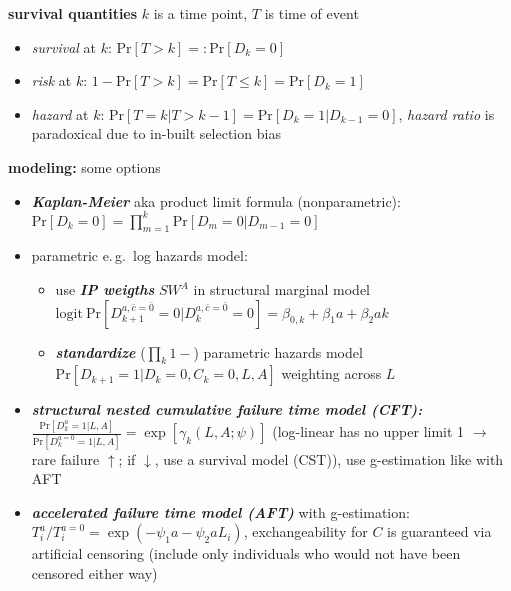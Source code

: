 \documentclass[8pt,twoside]{extarticle}
\begin{document}
\begin{multicols}{2}
\noindent \textbf{survival quantities} $k$ is a time point, $T$ is time of event
\begin{itemize}[itemsep=0em, topsep=0pt, partopsep=0pt,parsep=0pt, leftmargin=1.5em]
\setlength{\itemsep}{0pt}%
\setlength{\parskip}{0pt}
\item \textit{survival} at $k$: $\mathrm{Pr}\left[T>k\right] =:\mathrm{Pr}\left[D_k=0\right]$
\item \textit{risk} at $k$: $1-\mathrm{Pr}\left[T>k\right] = \mathrm{Pr}\left[T \leq k\right] = \mathrm{Pr}\left[D_k=1\right]$
\item \textit{hazard} at $k$: $\mathrm{Pr}\left[T=k|T> k{-}1\right] =\mathrm{Pr}\left[D_k=1|D_{k{-}1}=0\right]$, \textit{hazard ratio} is paradoxical due to  in-built selection bias
\end{itemize}

\noindent \textbf{modeling:} some options
\begin{itemize}[itemsep=0em, topsep=0pt, partopsep=0pt,parsep=0pt, leftmargin=1.5em]
\setlength{\itemsep}{0pt}%
\setlength{\parskip}{0pt}
\item \textit{\textbf{Kaplan-Meier}} aka product limit formula (nonparametric): $\mathrm{Pr}\left[D_k=0\right] = \prod_{m=1}^k \mathrm{Pr}\left[D_m=0|D_{m-1}=0\right]$
\item parametric e.\,g.\ log hazards model: 
\begin{itemize}[itemsep=0em, topsep=0pt, partopsep=0pt,parsep=0pt, leftmargin=1.5em]
\setlength{\itemsep}{0pt}%
\setlength{\parskip}{0pt}
\item use \textit{\textbf{IP weigths}} $SW^A$ in structural marginal model $\mathrm{logit} \: \mathrm{Pr}\left[D_{k+1}^{a, \bar{c}=\bar{0}}=0|D_{k}^{a, \bar{c}=\bar{0}}=0\right] = \beta_{0,k} + \beta_1a+\beta_2ak $
\item \textit{\textbf{standardize}} ($\prod_k 1-$) parametric hazards model $\mathrm{Pr}\left[D_{k+1}=1|D_k = 0, C_k=0, L, A\right]$ weighting across $L$
\end{itemize}
\item \textit{\textbf{structural nested cumulative failure time model (CFT):}}
$\frac{\mathrm{Pr}\left[D_k^a=1|L,A\right]}{\mathrm{Pr}\left[D_k^{a=0}=1|L,A\right]} = \exp\left[\gamma_k(L,A;\psi)\right]$ (log-linear has no upper limit 1 $\rightarrow$ rare failure $\uparrow$; if $\downarrow$, use a survival model (CST)), use g-estimation like with AFT
\item \textit{\textbf{accelerated failure time model (AFT)}} with g-estimation: $T_i^a/T_i^{a=0} = \exp(-\psi_1a -\psi_2aL_i)$, exchangeability for $C$ is guaranteed via artificial censoring (include only individuals who would not have been censored either way) 
\end{itemize}




\end{multicols}
\end{document}
